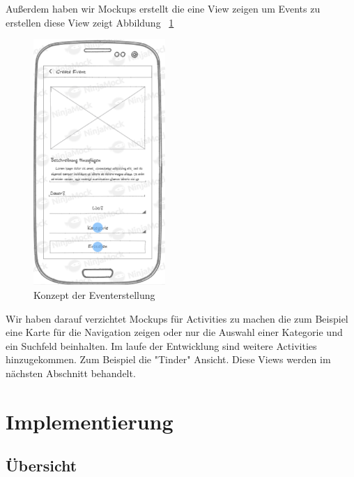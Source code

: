 \documentclass{scrartcl}
\begin{document}
Außerdem haben wir Mockups erstellt die eine View zeigen um Events zu erstellen diese View zeigt Abbildung ~\ref{fig:createevent_mockup}

\begin{figure}[h!tbp]
  \centering
  \includegraphics[width=5cm]{img/createevent_mockup}
  \caption{Konzept der Eventerstellung}\label{fig:createevent_mockup}
\end{figure}

Wir haben darauf verzichtet Mockups für Activities zu machen die zum Beispiel eine Karte für die Navigation zeigen oder nur die Auswahl einer Kategorie und ein Suchfeld beinhalten. Im laufe der Entwicklung sind weitere Activities hinzugekommen. Zum Beispiel die "Tinder" Ansicht. Diese Views werden im nächsten Abschnitt behandelt.

\newpage

\section{Implementierung}
\subsection{Übersicht}
\end{document}
